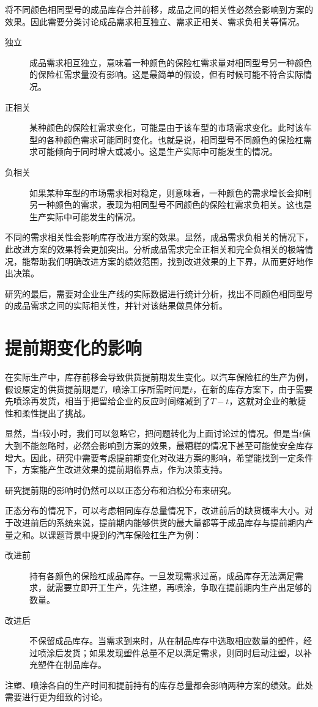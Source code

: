 将不同颜色相同型号的成品库存合并前移，成品之间的相关性必然会影响到方案的效果。因此需要分类讨论成品需求相互独立、需求正相关、需求负相关等情况。
\begin{description}
\item[独立]
成品需求相互独立，意味着一种颜色的保险杠需求量对相同型号另一种颜色的保险杠需求量没有影响。这是最简单的假设，但有时候可能不符合实际情况。
\item[正相关]
某种颜色的保险杠需求变化，可能是由于该车型的市场需求变化。此时该车型的各种颜色需求可能同时变化。也就是说，相同型号不同颜色的保险杠需求可能倾向于同时增大或减小。这是生产实际中可能发生的情况。
\item[负相关]
如果某种车型的市场需求相对稳定，则意味着，一种颜色的需求增长会抑制另一种颜色的需求，表现为相同型号不同颜色的保险杠需求负相关。这也是生产实际中可能发生的情况。
\end{description}

不同的需求相关性会影响库存改进方案的效果。显然，成品需求负相关的情况下，此改进方案的效果将会更加突出。分析成品需求完全正相关和完全负相关的极端情况，能帮助我们明确改进方案的绩效范围，找到改进效果的上下界，从而更好地作出决策。

研究的最后，需要对企业生产线的实际数据进行统计分析，找出不同颜色相同型号的成品需求之间的实际相关性，并针对该结果做具体分析。









\section{提前期变化的影响}

在实际生产中，库存前移会导致供货提前期发生变化。以汽车保险杠的生产为例，假设原定的供货提前期是$T$，喷涂工序所需时间是$t$，在新的库存方案下，由于需要先喷涂再发货，相当于把留给企业的反应时间缩减到了$T-t$，这就对企业的敏捷性和柔性提出了挑战。

显然，当$t$较小时，我们可以忽略它，把问题转化为上面讨论过的情况。但是当$t$值大到不能忽略时，必然会影响到方案的效果，最糟糕的情况下甚至可能使安全库存增大。因此，研究中需要考虑提前期变化对改进方案的影响，希望能找到一定条件下，方案能产生改进效果的提前期临界点，作为决策支持。

研究提前期的影响时仍然可以以正态分布和泊松分布来研究。

正态分布的情况下，可以考虑相同库存总量情况下，改进前后的缺货概率大小。对于改进前后的系统来说，提前期内能够供货的最大量都等于成品库存与提前期内产量之和。以课题背景中提到的汽车保险杠生产为例：
\begin{description}
\item[改进前]
持有各颜色的保险杠成品库存。一旦发现需求过高，成品库存无法满足需求，就需要立即开工生产，先注塑，再喷涂，争取在提前期内生产出足够的数量。
\item[改进后]
不保留成品库存。当需求到来时，从在制品库存中选取相应数量的塑件，经过喷涂后发货；如果发现塑件总量不足以满足需求，则同时启动注塑，以补充塑件在制品库存。
\end{description}
注塑、喷涂各自的生产时间和提前持有的库存总量都会影响两种方案的绩效。此处需要进行更为细致的讨论。

